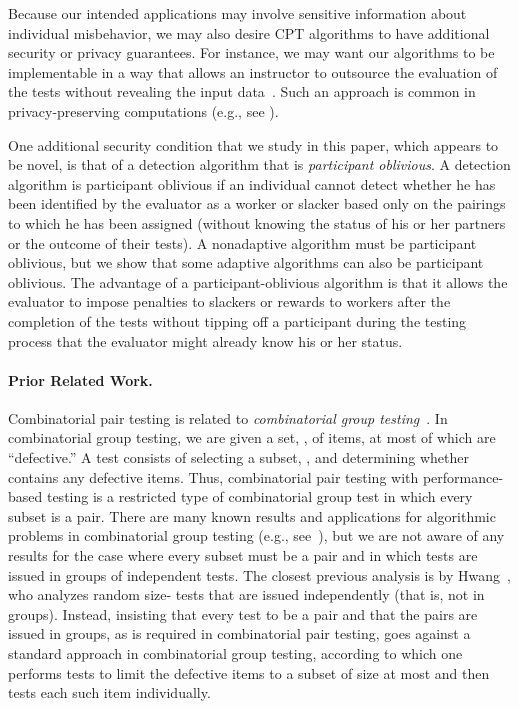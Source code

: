\documentclass[11pt]{llncs}
\renewcommand{\subsection}[1]{\paragraph{\bf #1.}}
\begin{document}
Because our intended applications may involve sensitive information about individual misbehavior, we may also desire CPT algorithms to have additional security or privacy 
guarantees.
For instance, we may want our algorithms to be implementable in a way that
allows an instructor to outsource the evaluation of the tests without
revealing the input data~\cite{Atallah:2008}.
Such an approach is common in privacy-preserving computations (e.g., see
\cite{Yao1986}).

One additional security condition that we study in this paper, which appears to
be novel, is that of a detection algorithm
that is \emph{participant oblivious}.
A detection algorithm is participant oblivious if an individual
cannot detect whether he has been identified by the evaluator as a worker or
slacker based only on the pairings to which he has been assigned (without knowing the status of his or her partners or the outcome of their tests).
A nonadaptive algorithm must be participant oblivious, but we show
that some adaptive algorithms can also be participant oblivious.
The advantage of a participant-oblivious algorithm is that it allows the
evaluator to impose penalties to slackers or rewards to workers after the completion of the tests without tipping off a participant during
the testing process that the evaluator might already know his or her status.

\subsection{Prior Related Work}
Combinatorial pair testing
is related to \emph{combinatorial group testing}~\cite{du2000}. 
In combinatorial group testing, we are given a set, , of  items,
at most  of which are ``defective.''
A test consists of selecting a subset, , and determining whether  contains any defective items.
Thus, combinatorial pair testing with performance-based testing is a 
restricted type of combinatorial group test in which every subset is a pair.
There are many known results and applications for algorithmic problems
in combinatorial group testing
(e.g., see~\cite{du2000,Eppstein:2006,gat-iidf-05}), 
but we are not aware 
of any results for the case where every subset must be a pair and in which tests
are issued in groups of  independent tests.
The closest previous analysis is by Hwang~\cite{Hwang:2000}, 
who analyzes random size- tests that are issued independently 
(that is, not in groups).
Instead, insisting that every test to be a pair and that the pairs
are issued in groups, as is required
in combinatorial pair testing, goes against a standard 
approach in combinatorial group testing, according to which one performs tests to limit 
the defective items
to a subset of size at most  and then tests each such item
individually.
\end{document}
